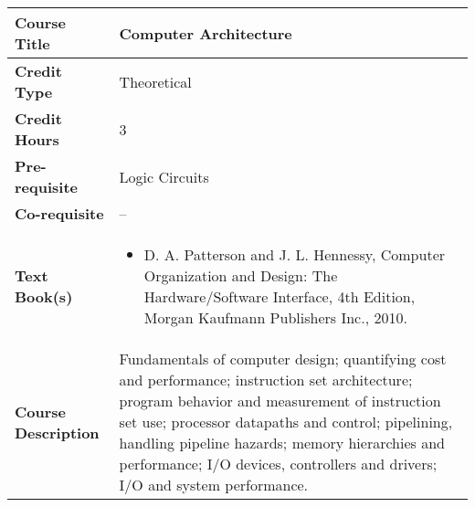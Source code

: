 \documentclass[11pt]{article}
\begin{document}
\begin{table}[h!]
\begin{tabular}{|l|l|}
\hline
\textbf{Course Title}       &   Computer Architecture\\ \hline
\textbf{Credit Type}        &  Theoretical \\ \hline
\textbf{Credit Hours}       &  3 \\ \hline
\textbf{Pre-requisite}       &  Logic Circuits \\ \hline
\textbf{Co-requisite}       &  -- \\ \hline
\textbf{Text Book(s)}       & \begin{minipage}{.70\textwidth}
\begin{itemize} \itemsep-0.4em
	\vspace{3mm}
	\item D. A. Patterson and J. L. Hennessy, Computer Organization and Design: The Hardware/Software Interface, 4th Edition, Morgan Kaufmann Publishers Inc., 2010.
	\vspace{3mm}
\end{itemize}
\end{minipage}\\ \hline
\textbf{Course Description} & \begin{minipage}{.70\textwidth}
\vspace{3mm}
Fundamentals of computer design; quantifying cost and performance; instruction set architecture; program behavior and measurement of instruction set use; processor datapaths and control; pipelining, handling pipeline hazards; memory hierarchies and performance; I/O devices, controllers and drivers; I/O and system performance.
\vspace{3mm}
\end{minipage} \\ \hline
\end{tabular}
\end{table}
\end{document}
